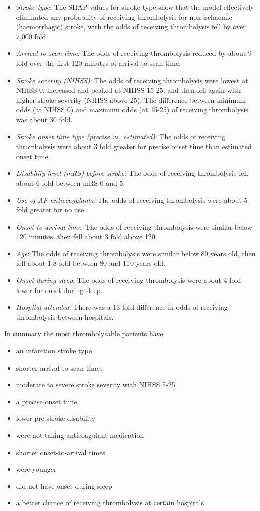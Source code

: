 \begin{itemize}
    \item \emph{Stroke type}: The SHAP values for stroke type show that the model effectively eliminated any probability of receiving thrombolysis for non-ischaemic (haemorrhagic) stroke, with the odds of receiving thrombolysis fell by over 7,000 fold.
    \item \emph{Arrival-to-scan time}: The odds of receiving thrombolysis reduced by about 9 fold over the first 120 minutes of arrival to scan time.
    \item \emph{Stroke severity (NIHSS)}: The odds of receiving thrombolysis were lowest at NIHSS 0, increased and peaked at NIHSS 15-25, and then fell again with higher stroke severity (NIHSS above 25). The difference between minimum odds (at NIHSS 0) and maximum odds (at 15-25) of receiving thrombolysis was about 30 fold.
    \item \emph{Stroke onset time type (precise vs. estimated)}: The odds of receiving thrombolysis were about 3 fold greater for precise onset time than estimated onset time.
    \item \emph{Disability level (mRS) before stroke}: The odds of receiving thrombolysis fell about 6 fold between mRS 0 and 5.
    \item \emph{Use of AF anticoagulants}: The odds of receiving thrombolysis were about 5 fold greater for no use.
    \item \emph{Onset-to-arrival time}: The odds of receiving thrombolysis were similar below 120 minutes, then fell about 3 fold above 120.
    \item \emph{Age}: The odds of receiving thrombolysis were similar below 80 years old, then fell about 1.8 fold between 80 and 110 years old.    
    \item \emph{Onset during sleep}: The odds of receiving thrombolysis were about 4 fold lower for onset during sleep.
    \item \emph{Hospital attended}: There was a 13 fold difference in odds of receiving thrombolysis between hospitals.
\end{itemize}

In summary the most thrombolysable patients have:
\begin{itemize}
    \item an infarction stroke type
    \item shorter arrival-to-scan times
    \item moderate to severe stroke severity with NIHSS 5-25
    \item a precise onset time
    \item lower pre-stroke disability
    \item were not taking anticoagulant medication
    \item shorter onset-to-arrival times
    \item were younger
    \item did not have onset during sleep
    \item a better chance of receiving thrombolysis at certain hospitals
\end{itemize}

